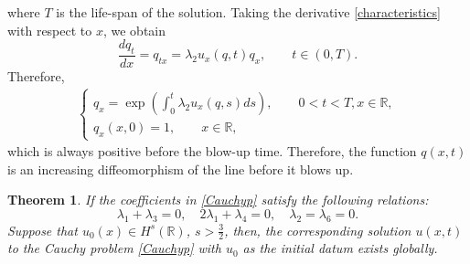 \documentclass[11pt]{article}
\newtheorem{theorem}{Theorem}
\begin{document}
where $T$ is the life-span of the solution.
Taking the derivative \eqref{characteristics} with respect to $x$, we obtain
$$\frac{dq_t}{dx}=q_{tx}=\lambda_2u_x(q,t)q_x, \qquad t\in(0,T).$$
Therefore,
\begin{eqnarray*}\label{qx}
\left\{
  \begin{array}{ll}
   q_x=\exp\left(\int^t_0\lambda_2u_x(q,s)ds\right), \qquad 0<t<T, x\in \mathbb{R},\\
   q_x(x,0)=1, \qquad x\in \mathbb{R},
  \end{array}
\right.
\end{eqnarray*}
which is always positive before the blow-up time. Therefore, the function $q(x,t)$ is an increasing diffeomorphism of the line before it blows up.
\begin{theorem}\label{GE}
If the coefficients in \eqref{Cauchyp} satisfy the following relations:
\begin{equation}\label{constraintsforGE}
\lambda_1+\lambda_3=0,\quad 2\lambda_1+\lambda_4 =0,\quad \lambda_2 = \lambda_6=0.
\end{equation}
Suppose that $u_0(x)\in H^s(\mathbb{R})$, $s>\frac{3}{2}$, then, the corresponding solution $u(x, t)$ to
the Cauchy problem \eqref{Cauchyp} with $u_0$ as the initial datum exists globally.
\end{theorem}
\end{document}
